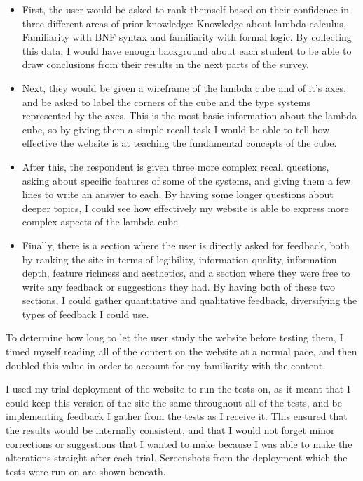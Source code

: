 \documentclass{l4proj}
\begin{document}
\begin{itemize}
    \item First, the user would be asked to rank themself based on their confidence in three different areas of prior knowledge: Knowledge about lambda calculus, Familiarity with BNF syntax and familiarity with formal logic.  By collecting this data, I would have enough background about each student to be able to draw conclusions from their results in the next parts of the survey.

    \item Next, they would be given a wireframe of the lambda cube and of it's axes, and be asked to label the corners of the cube and the type systems represented by the axes.  This is the most basic information about the lambda cube, so by giving them a simple recall task I would be able to tell how effective the website is at teaching the fundamental concepts of the cube.

    \item After this, the respondent is given three more complex recall questions, asking about specific features of some of the systems, and giving them a few lines to write an answer to each.  By having some longer questions about deeper topics, I could see how effectively my website is able to express more complex aspects of the lambda cube.

    \item Finally, there is a section where the user is directly asked for feedback, both by ranking the site in terms of legibility, information quality, information depth, feature richness and aesthetics, and a section where they were free to write any feedback or suggestions they had.  By having both of these two sections, I could gather quantitative and qualitative feedback, diversifying the types of feedback I could use.
\end{itemize}

To determine how long to let the user study the website before testing them, I timed myself reading all of the content on the website at a normal pace, and then doubled this value in order to account for my familiarity with the content.

I used my trial deployment of the website to run the tests on, as it meant that I could keep this version of the site the same throughout all of the tests, and be implementing feedback I gather from the tests as I receive it.  This ensured that the results would be internally consistent, and that I would not forget minor corrections or suggestions that I wanted to make because I was able to make the alterations straight after each trial.  Screenshots from the deployment which the tests were run on are shown beneath.
\end{document}
